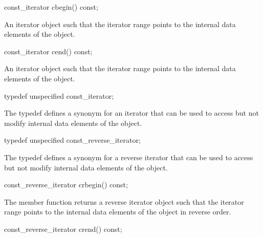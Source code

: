 \begin{addedblock}
\begin{itemdecl}
const_iterator cbegin() const;		
\end{itemdecl}

\begin{itemdescr}
\returns An iterator object such that the iterator range \tcode{[cbegin(), cend())} points to the internal data elements of the  object.		
\end{itemdescr}

\begin{itemdecl}
const_iterator cend() const;		
\end{itemdecl}

\begin{itemdescr}
\returns An iterator object such that the iterator range \tcode{[cbegin(), cend())} points to the internal data elements of the  object.		
\end{itemdescr}

\begin{itemdecl}
typedef unspecified const_iterator;		
\end{itemdecl}

\begin{itemdescr}
The typedef defines a synonym for an iterator that can be used to access but not modify internal data elements of the  object.		
\end{itemdescr}

\begin{itemdecl}
typedef unspecified const_reverse_iterator;		
\end{itemdecl}

\begin{itemdescr}
The typedef defines a synonym for a reverse iterator that can be used to access but not modify internal data elements of the  object.		
\end{itemdescr}

\begin{itemdecl}
const_reverse_iterator crbegin() const;		
\end{itemdecl}

\begin{itemdescr}
\returns The member function returns a reverse iterator object such that the iterator range \tcode{[crbegin(), crend())} points to the internal data elements of the  object in reverse order.		
\end{itemdescr}

\begin{itemdecl}
const_reverse_iterator crend() const;		
\end{itemdecl}


\end{addedblock}
